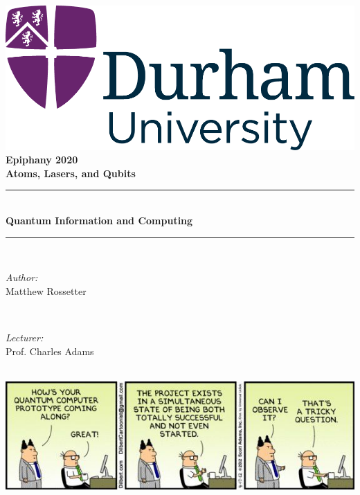 \documentclass[a4paper, 11pt, normalem]{report}
\begin{document}
\begin{titlepage}
    \newcommand{\HRule}{\rule{\linewidth}{0.5mm}}
    \center
    {\includegraphics[scale=0.5]{../../logo0.png}\hfill{\Large\bfseries Epiphany 2020}}\\[2.5cm]
    {\LARGE\bfseries Atoms, Lasers, and Qubits}\\[1.5cm]
    \HRule \\[0.7cm]
    {\huge\bfseries Quantum Information and Computing}\\[0.4cm]
    \HRule \\[1.5cm]

    \begin{minipage}{0.4\textwidth}
        \begin{flushleft} \large
            \emph{Author:} \\ Matthew Rossetter
        \end{flushleft}
    \end{minipage}~
    \begin{minipage}{0.4\textwidth}
        \begin{flushright} \large
            \emph{Lecturer:} \\ Prof. Charles Adams
        \end{flushright}
    \end{minipage}\\[2cm]
    \vfill
    \includegraphics[width=\textwidth]{csa.jpg}\\[1cm]
    \vfill
\end{titlepage}
\tableofcontents
\end{document}

